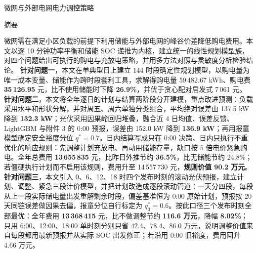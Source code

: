 \documentclass[12pt,a4paper,fontset=fandol]{ctexart}
\begin{document}
\begin{center}{\heiti 微网与外部电网电力调控策略}\end{center}

\vspace{0.5em}

\begin{center}{\heiti 摘\quad 要}\end{center}

微网需在满足小区负载的前提下利用储能与外部电网的峰谷价差降低购电费用\nobreak。本文以逐 10 分钟功率平衡和储能 SOC 递推为内核\nobreak，建立统一的线性规划模型族\nobreak，对四个问题给出可执行的购电与充放电策略\nobreak，并用多方法对照与灵敏度分析检验结论\nobreak。
\textbf{针对问题一}\nobreak，本文在单典型日上建立 144 时段确定性规划模型\nobreak，以购电量为唯一成本变量\nobreak、储能作为跨时段套利工具\nobreak，求解得购电量 59\,482.67 kWh\nobreak、购电费 \textbf{35\,126.95} 元\nobreak，比不使用储能时下降 \textbf{26.9\%}\nobreak，并优于贪心配对启发式 7\,061 元\nobreak。
\textbf{针对问题二}\nobreak，本文将全年逐日的计划与结算两阶段分开建模\nobreak，重点改进预测\nobreak：负载采用水平和形状分解\nobreak，并对周五\nobreak、周六单独分类组合\nobreak，平均绝对误差由 137.5 kW 降到 \textbf{132.3 kW}\nobreak；光伏采用因果岭回归堆叠\nobreak，融合近 4 日均值\nobreak、误差反馈\nobreak、LightGBM 与附件 3 的 0:00 预报\nobreak，误差由 152.0 kW 降到 \textbf{136.9 kW}\nobreak；再用报童模型确定安全裕度分位 $q^*=0.7$\nobreak。日内结算写成只在 0:00 决策\nobreak、日内只执行不重优化的响应规则\nobreak：先调整计划充放电\nobreak、再动用储能存量\nobreak，缺口按 5 倍电价紧急购电\nobreak。全年总费用 \textbf{13\,655\,835} 元\nobreak，比昨日外推节约 \textbf{36.5\%}\nobreak，比无储能节约 24.8\%\nobreak；若僵硬执行计划而不启用该规则\nobreak，费用升至 14\,557\,730 元\nobreak，\textbf{规则价值 90.2 万元}\nobreak。
\textbf{针对问题三}\nobreak，本文引入 0\nobreak、6\nobreak、12\nobreak、18 时四个发布时刻的滚动光伏预报\nobreak，建立计划\nobreak、调整\nobreak、紧急三段计价模型\nobreak，并把计划改造成逐段滚动管道\nobreak：一天分四段\nobreak，每段从上一段实际储电量出发重解剩余时段\nobreak，偏差基准恒为 0:00 原始计划\nobreak，预报按 20 天同链误差做因果去偏\nobreak，报童分位自行标定为 $q_3^*=0.6$\nobreak。按此口径三个发布时刻全部最优\nobreak：全年费用 \textbf{13\,368\,415} 元\nobreak，比不做调整节约 \textbf{116.6 万元}\nobreak，降幅 \textbf{8.02\%}\nobreak；只用 6:00\nobreak、12:00\nobreak、18:00 单时刻分别只省 42.4\nobreak、78.4\nobreak、86.0 万元\nobreak，说明调整价值来自每段都用最新预报并从实际 SOC 出发修正\nobreak；若沿用 0:00 旧裕度\nobreak，费用回升 4.66 万元\nobreak。
\end{document}

